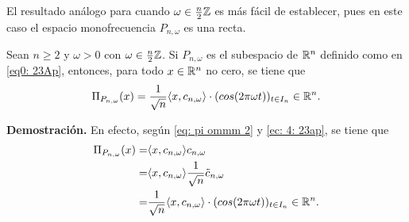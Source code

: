 El resultado análogo para cuando $\omega \in \frac{n}{2}\mathbb{Z}$
es más fácil de establecer, pues en este caso
el espacio monofrecuencia $P_{n, \omega}$ es una recta.

\begin{teo}
\label{teo: amelie2}
Sean $n \geq 2$ y $\omega > 0$ con $\omega \in \frac{n}{2}\mathbb{Z}$.
Si $P_{n, \omega}$ es el subespacio de $\mathbb{R}^{n}$ definido como 
en \eqref{eq0: 23Ap}, entonces, para todo 
$x \in \mathbb{R}^{n}$ no cero, se tiene que
\begin{equation}
\label{ec: desfase explicito 2}
\Pi_{P_{n, \omega}} (x) = 
\frac{1}{\sqrt{n}} \langle x, c_{n, \omega} \rangle
\cdot (cos (2 \pi \omega t))_{t \in I_{n}} \in \mathbb{R}^{n}.
\end{equation}
\end{teo}
\noindent
\textbf{Demostración.}
En efecto, según \eqref{eq: pi ommm 2} y 
\eqref{ec: 4: 23ap},
se tiene que
\begin{align*}
\Pi_{P_{n, \omega}} (x) = & 
\langle x, c_{n, \omega} \rangle c_{n, \omega} \\
= & \langle x, c_{n, \omega} \rangle \frac{1}{\sqrt{n}} \tilde{c}_{n, \omega} \\
= & \frac{1}{\sqrt{n}} \langle x, c_{n, \omega} \rangle
\cdot (cos (2 \pi \omega t))_{t \in I_{n}} \in \mathbb{R}^{n}.
\end{align*}

\QEDB
\vspace{0.2cm}





